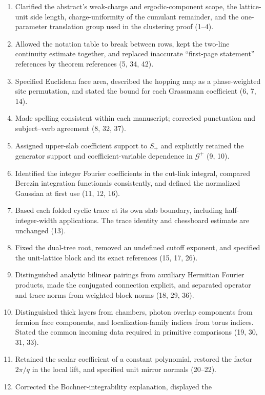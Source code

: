 \documentclass[11pt,letterpaper,reqno]{amsart}
\begin{document}
\begin{enumerate}[label=\arabic*.,leftmargin=*,itemsep=4pt]
\item Clarified the abstract's weak-charge and ergodic-component scope,
the lattice-unit side length, charge-uniformity of the cumulant remainder,
and the one-parameter translation group used in the clustering proof
(1--4).
\item Allowed the notation table to break between rows, kept the
two-line continuity estimate together, and replaced inaccurate
``first-page statement'' references by theorem references (5, 34, 42).
\item Specified Euclidean face area, described the hopping map as a
phase-weighted site permutation, and stated the bound for each Grassmann
coefficient (6, 7, 14).
\item Made spelling consistent within each manuscript; corrected
punctuation and subject--verb agreement (8, 32, 37).
\item Assigned upper-slab coefficient support to $S_+$ and explicitly
retained the generator support and coefficient-variable dependence in
$\mathcal G^+$ (9, 10).
\item Identified the integer Fourier coefficients in the cut-link
integral, compared Berezin integration functionals consistently, and
defined the normalized Gaussian at first use (11, 12, 16).
\item Based each folded cyclic trace at its own slab boundary, including
half-integer-width applications. The trace identity and chessboard
estimate are unchanged (13).
\item Fixed the dual-tree root, removed an undefined cutoff exponent,
and specified the unit-lattice block and its exact references (15, 17, 26).
\item Distinguished analytic bilinear pairings from auxiliary Hermitian
Fourier products, made the conjugated connection explicit, and separated
operator and trace norms from weighted block norms (18, 29, 36).
\item Distinguished thick layers from chambers, photon overlap
components from fermion face components, and localization-family indices
from torus indices. Stated the common incoming data required in primitive
comparisons (19, 30, 31, 33).
\item Retained the scalar coefficient of a constant polynomial, restored
the factor $2\pi/q$ in the local lift, and specified unit mirror normals
(20--22).
\item Corrected the Bochner-integrability explanation, displayed the

\end{enumerate}
\end{document}
